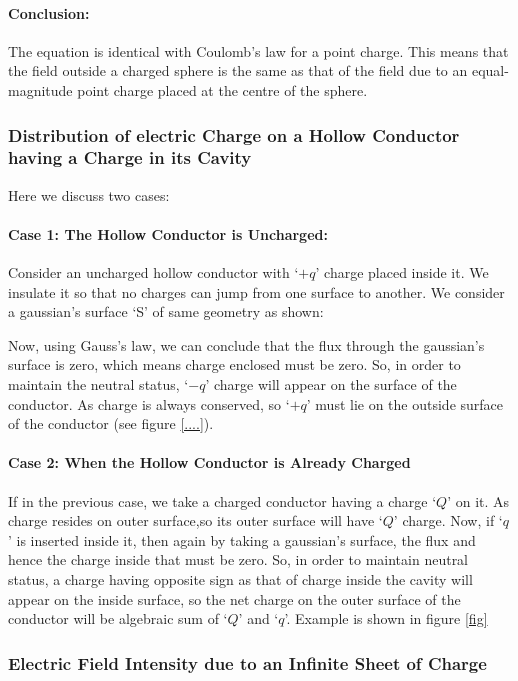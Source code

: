 \paragraph{Conclusion:}
The equation is identical with Coulomb’s law for a point charge.
This means that the field outside a charged sphere is the same as
that of the field due to an equal-magnitude point charge
placed at the centre of the sphere.
\subsubsection{Distribution of electric Charge on a
Hollow Conductor having a Charge in its Cavity}
Here we discuss two cases:
\paragraph{Case 1: The Hollow Conductor is Uncharged:}
Consider an uncharged hollow conductor with `$+q$' charge placed inside it.
We insulate it so that no charges can jump from one surface to another.
We consider a gaussian’s surface `S’ of same geometry as shown:

Now, using Gauss’s law, we can conclude that the flux through
the gaussian’s surface is zero, which means charge enclosed must be zero.
So, in order to maintain the neutral status, `$-q$' charge will
appear on the surface of the conductor. As charge is always conserved,
so `$+q$' must lie on the outside surface of the conductor
(see figure \ref{....}).

\paragraph{Case 2: When the Hollow Conductor is Already Charged}
If in the previous case, we take a charged conductor having a charge `$Q$'
on it. As charge resides on outer surface,so its outer surface will have
`$Q$' charge. Now, if `$q$' is inserted inside it, then again by
taking a gaussian’s surface, the flux and hence the charge inside
that must be zero. So, in order to maintain neutral status,
a charge having opposite sign as that of charge inside the cavity
will appear on the inside surface, so the net charge on the outer
surface of the conductor will be algebraic sum of `$Q$' and `$q$'.
Example is shown in figure \ref{fig}

\subsubsection{Electric Field Intensity due to an Infinite Sheet of Charge}
